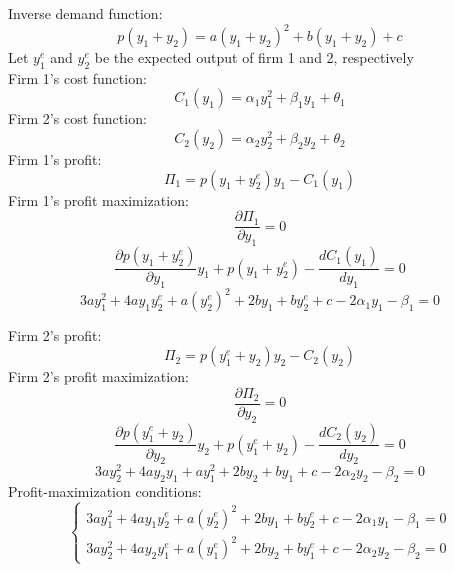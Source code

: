 \documentclass[11pt, a4paper]{article}
\begin{document}
Inverse demand function:
\begin{equation*}
	p(y_{1} + y_{2}) = a(y_{1} + y_{2})^2 + b(y_{1} + y_{2})  + c
\end{equation*}
Let $y_{1}^e$ and $y_{2}^e$ be the expected output of firm 1 and 2, respectively \\
Firm 1's cost function:
\begin{equation*}
	C_{1}(y_{1}) = \alpha _{1}y_{1}^2 + \beta _{1}y_{1} + \theta _{1}
\end{equation*}
Firm 2's cost function:
\begin{equation*}
	C_{2}(y_{2}) = \alpha _{2}y_{2}^2 + \beta _{2}y_{2} + \theta _{2}
\end{equation*}
Firm 1's profit:
\begin{equation*}
	\Pi _{1} = p(y_{1} + y_{2}^e)y_{1} - C_{1}(y_{1})
\end{equation*}
Firm 1's profit maximization:
\begin{equation*}
	\frac{\partial\Pi_{1}}{\partial y_{1}} = 0
\end{equation*}
\begin{equation*}
	\frac{\partial p(y_{1} + y_{2}^e)}{\partial y_{1}}y_{1} + p(y_{1} + y_{2}^e) - \frac{dC_{1}(y_{1})}{dy_{1}} = 0
\end{equation*}
\begin{equation*}
	3ay_{1}^2 + 4ay_{1}y_{2}^e + a(y_{2}^e)^2 + 2by_{1} + by_{2}^e + c - 2\alpha _{1}y_{1} - \beta _{1} = 0
\end{equation*}

Firm 2's profit:
\begin{equation*}
	\Pi _{2} = p(y_{1}^e + y_{2})y_{2} - C_{2}(y_{2})
\end{equation*}
Firm 2's profit maximization:
\begin{equation*}
	\frac{\partial\Pi_{2}}{\partial y_{2}} = 0
\end{equation*}
\begin{equation*}
	\frac{\partial p(y_{1}^e + y_{2})}{\partial y_{2}}y_{2} + p(y_{1}^e + y_{2}) - \frac{dC_{2}(y_{2})}{dy_{2}} = 0
\end{equation*}
\begin{equation*}
	3ay_{2}^2 + 4ay_{2}y_{1} + ay_{1}^2 + 2by_{2} + by_{1} + c - 2\alpha _{2}y_{2} - \beta _{2} = 0
\end{equation*}
Profit-maximization conditions:
\begin{equation*}
	\begin{cases}
		3ay_{1}^2 + 4ay_{1}y_{2}^e + a(y_{2}^e)^2 + 2by_{1} + by_{2}^e + c - 2\alpha _{1}y_{1} - \beta _{1} = 0 \\
		3ay_{2}^2 + 4ay_{2}y_{1}^e + a(y_{1}^e)^2 + 2by_{2} + by_{1}^e + c - 2\alpha _{2}y_{2} - \beta _{2} = 0
	\end{cases}
\end{equation*}
\end{document}
